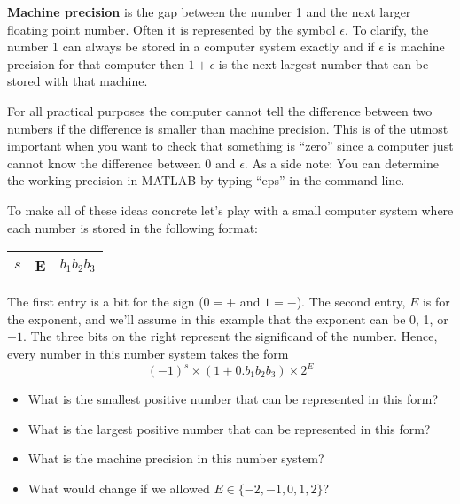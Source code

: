 \begin{definition}
    {\bf Machine precision} is the gap between the number 1 and the next larger floating
    point number. Often it is represented by the symbol $\epsilon$. To clarify, the number 1 can
    always be stored in a computer system exactly and if $\epsilon$ is machine
    precision for that computer then $1+\epsilon$ is the next largest number that can
    be stored with that machine. 
\end{definition}
For all practical purposes the computer cannot tell the difference between two numbers if
the difference is smaller than machine precision. This is of the utmost important when you
want to check that something is ``zero'' since a computer just cannot know the difference
between $0$ and $\epsilon$.
\ifnum{} As a side note: You can determine the working precision in MATLAB by
typing ``eps'' in the command line.\fi



\begin{problem}
    To make all of these ideas concrete let's play with a small computer system where each
    number is stored in the following format:
    \begin{center}
        \begin{tabular}{|c|c|c|}
            \hline
            $s$ & E & $b_1b_2b_3$ \\ \hline
        \end{tabular}
    \end{center}
    The first entry is a bit for the sign (0$=+$ and $1=-$). The second entry, $E$ is for the
    exponent, and we'll assume in this example that the exponent can be 0, 1, or $-1$.  The
    three bits on the right represent the significand of the number.  Hence, every number in
    this number system takes the form
    \[ (-1)^s \times (1+ 0.b_1b_2b_3) \times 2^{E} \]
    \begin{itemize}
        \item What is the smallest positive number that can be represented in this
            form?\\
        \item What is the largest positive number that can be represented in this
            form?\\
        \item What is the machine precision in this number system? \\
        \item What would change if we allowed $E \in \{-2,-1,0,1,2\}$?\\
    \end{itemize}
\end{problem}


